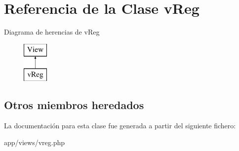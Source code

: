 \hypertarget{classv_reg}{}\section{Referencia de la Clase v\+Reg}
\label{classv_reg}
Diagrama de herencias de v\+Reg\begin{figure}[H]
\begin{center}
\leavevmode
\includegraphics[height=2.000000cm]{classv_reg}
\end{center}
\end{figure}
\subsection*{Otros miembros heredados}


La documentación para esta clase fue generada a partir del siguiente fichero\+:\begin{DoxyCompactItemize}
\item 
app/views/vreg.\+php\end{DoxyCompactItemize}
